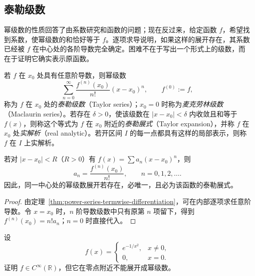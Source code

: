 \documentclass[UTF8,12pt,a4paper,fontset=fandol]{ctexbook}
\begin{document}
\subsection{泰勒级数}
\label{subsec:taylor-series}

幂级数的性质回答了由系数研究和函数的问题；现在反过来，给定函数 $f$，希望找到系数，使幂级数的和恰好等于 $f$。逐项求导说明，如果这样的展开存在，其系数已经被 $f$ 在中心处的各阶导数完全确定。困难不在于写出一个形式上的级数，而在于证明它确实表示原函数。

\begin{definition}
\label{def:taylor-series-and-real-analyticity}
若 $f$ 在 $x_0$ 处具有任意阶导数，则幂级数
\begin{equation}
    \sum_{n=0}^\infty\frac{f^{(n)}(x_0)}{n!}(x-x_0)^n,
    \qquad f^{(0)}:=f,
    \label{eq:taylor-series-definition}
\end{equation}
称为 $f$ 在 $x_0$ 处的\emph{泰勒级数}（Taylor series）；$x_0=0$ 时称为\emph{麦克劳林级数}（Maclaurin series）。若存在 $\delta>0$，使该级数在 $|x-x_0|<\delta$ 内收敛且和等于 $f(x)$，则称这个等式为 $f$ 在 $x_0$ 附近的\emph{泰勒展式}（Taylor expansion），并称 $f$ 在 $x_0$ 处\emph{实解析}（real analytic）。若开区间 $I$ 的每一点都具有这样的局部表示，则称 $f$ 在 $I$ 上实解析。
\end{definition}

\begin{theorem}[幂级数展开的唯一性]
\label{thm:uniqueness-of-power-series-expansion}
若对 $|x-x_0|<R$（$R>0$）有 $f(x)=\sum a_n(x-x_0)^n$，则
\begin{equation}
    a_n=\frac{f^{(n)}(x_0)}{n!},\qquad n=0,1,2,\ldots.
    \label{eq:power-series-coefficients-by-derivatives}
\end{equation}
因此，同一中心处的幂级数展开若存在，必唯一，且必为该函数的泰勒展式。
\end{theorem}

\begin{proof}
由定理~\ref{thm:power-series-termwise-differentiation}，可在内部逐项求任意阶导数。令 $x=x_0$ 时，$n$ 阶导数级数中只有原第 $n$ 项留下，得到 $f^{(n)}(x_0)=n!a_n$；$n=0$ 时直接代入。
\end{proof}

\begin{example}
\label{ex:smooth-flat-function-not-real-analytic}
设
\[
    f(x)=\begin{cases}e^{-1/x^2},&x\neq0,\\0,&x=0.\end{cases}
\]
证明 $f\in C^\infty(\mathbb R)$，但它在零点附近不能展开成幂级数。
\end{example}
\end{document}
